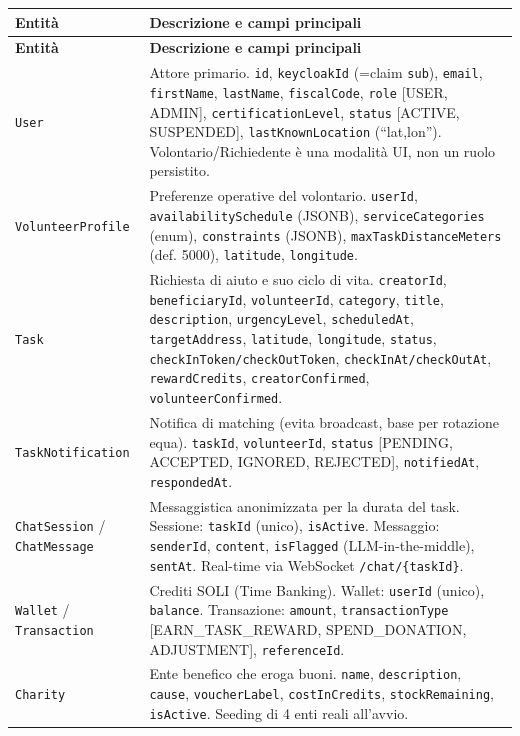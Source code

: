 \documentclass[11pt,a4paper]{article}
\begin{document}
\begin{xltabular}{\linewidth}{|L{4.0cm}|Y|}
\hline
{}\color{white}\bfseries Entit\`a & \color{white}\bfseries Descrizione e campi principali\\\hline
\endfirsthead
\hline
{}\color{white}\bfseries Entit\`a & \color{white}\bfseries Descrizione e campi principali\\\hline
\endhead
\texttt{User} & Attore primario. \texttt{id}, \texttt{keycloakId} (=claim \texttt{sub}), \texttt{email}, \texttt{firstName}, \texttt{lastName}, \texttt{fiscalCode}, \texttt{role} [USER, ADMIN], \texttt{certificationLevel}, \texttt{status} [ACTIVE, SUSPENDED], \texttt{lastKnownLocation} (``lat,lon''). Volontario/Richiedente \`e una modalit\`a UI, non un ruolo persistito.\\\hline
\texttt{VolunteerProfile} & Preferenze operative del volontario. \texttt{userId}, \texttt{availabilitySchedule} (JSONB), \texttt{serviceCategories} (enum), \texttt{constraints} (JSONB), \texttt{maxTaskDistanceMeters} (def. 5000), \texttt{latitude}, \texttt{longitude}.\\\hline
\texttt{Task} & Richiesta di aiuto e suo ciclo di vita. \texttt{creatorId}, \texttt{beneficiaryId}, \texttt{volunteerId}, \texttt{category}, \texttt{title}, \texttt{description}, \texttt{urgencyLevel}, \texttt{scheduledAt}, \texttt{targetAddress}, \texttt{latitude}, \texttt{longitude}, \texttt{status}, \texttt{checkInToken/checkOutToken}, \texttt{checkInAt/checkOutAt}, \texttt{rewardCredits}, \texttt{creatorConfirmed}, \texttt{volunteerConfirmed}.\\\hline
\texttt{TaskNotification} & Notifica di matching (evita broadcast, base per rotazione equa). \texttt{taskId}, \texttt{volunteerId}, \texttt{status} [PENDING, ACCEPTED, IGNORED, REJECTED], \texttt{notifiedAt}, \texttt{respondedAt}.\\\hline
\texttt{ChatSession} / \texttt{ChatMessage} & Messaggistica anonimizzata per la durata del task. Sessione: \texttt{taskId} (unico), \texttt{isActive}. Messaggio: \texttt{senderId}, \texttt{content}, \texttt{isFlagged} (LLM-in-the-middle), \texttt{sentAt}. Real-time via WebSocket \texttt{/chat/\{taskId\}}.\\\hline
\texttt{Wallet} / \texttt{Transaction} & Crediti SOLI (Time Banking). Wallet: \texttt{userId} (unico), \texttt{balance}. Transazione: \texttt{amount}, \texttt{transactionType} [EARN\_TASK\_REWARD, SPEND\_DONATION, ADJUSTMENT], \texttt{referenceId}.\\\hline
\texttt{Charity} & Ente benefico che eroga buoni. \texttt{name}, \texttt{description}, \texttt{cause}, \texttt{voucherLabel}, \texttt{costInCredits}, \texttt{stockRemaining}, \texttt{isActive}. Seeding di 4 enti reali all'avvio.\\\hline

\end{xltabular}
\end{document}
